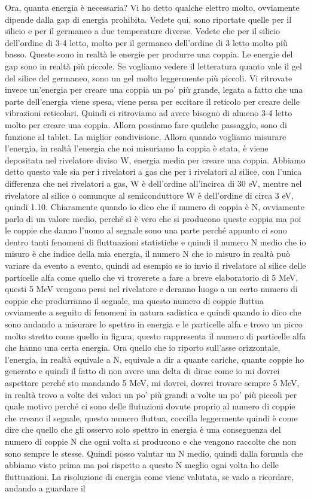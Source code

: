 {Ora, quanta energia è necessaria? Vi ho detto qualche elettro molto, ovviamente dipende dalla gap di energia prohibita. Vedete qui, sono riportate quelle per il silicio e per il germaneo a due temperature diverse. Vedete che per il silicio dell'ordine di 3-4 letto, molto per il germaneo dell'ordine di 3 letto molto più basso. Queste sono in realtà le energie per produrre una coppia. Le energie del gap sono in realtà più piccole. Se vogliamo vedere il letteratura quanto vale il gel del silice del germaneo, sono un gel molto leggermente più piccoli. Vi ritrovate invece un'energia per creare una coppia un po' più grande, legata a fatto che una parte dell'energia viene spesa, viene persa per eccitare il reticolo per creare delle vibrazioni reticolari. Quindi ci ritroviamo ad avere bisogno di almeno 3-4 letto molto per creare una coppia. Allora possiamo fare qualche passaggio, sono di funzione al tablet. La miglior condivisione. Allora quando vogliamo misurare l'energia, in realtà l'energia che noi misuriamo la coppia è stata, è viene depositata nel rivelatore diviso W, energia media per creare una coppia. Abbiamo detto questo vale sia per i rivelatori a gas che per i rivelatori al silice, con l'unica differenza che nei rivelatori a gas, W è dell'ordine all'incirca di 30 eV, mentre nel rivelatore al silice o comunque al semiconduttore W è dell'ordine di circa 3 eV, quindi 1.10. Chiaramente quando io dico che il numero di coppia è N, ovviamente parlo di un valore medio, perché sì è vero che si producono queste coppia ma poi le coppie che danno l'uomo al segnale sono una parte perché appunto ci sono dentro tanti fenomeni di fluttuazioni statistiche e quindi il numero N medio che io misuro è che indice della mia energia, il numero N che io misuro in realtà può variare da evento a evento, quindi ad esempio se io invio il rivelatore al silice delle particelle alfa come quello che vi troverete a fare a breve elaboratorio di 5 MeV, questi 5 MeV vengono persi nel rivelatore e deranno luogo a un certo numero di coppie che produrranno il segnale, ma questo numero di coppie fluttua ovviamente a seguito di fenomeni in natura sadistica e quindi quando io dico che sono andando a misurare lo spettro in energia e le particelle alfa e trovo un picco molto stretto come quello in figura, questo rappresenta il numero di particelle alfa che hanno una certa energia. Ora quello che io riporto sull'asse orizzontale, l'energia, in realtà equivale a N, equivale a dir a quante cariche, quante coppie ho generato e quindi il fatto di non avere una delta di dirac come io mi dovrei aspettare perché sto mandando 5 MeV, mi dovrei, dovrei trovare sempre 5 MeV, in realtà trovo a volte dei valori un po' più grandi a volte un po' più piccoli per quale motivo perché ci sono delle flutuzioni dovute proprio al numero di coppie che creano il segnale, questo numero fluttua, coccilla leggermente quindi è come dire che quello che gli osservo solo spettro in energia è una conseguenza del numero di coppie N che ogni volta si producono e che vengono raccolte che non sono sempre le stesse. Quindi posso valutar un N medio, quindi dalla formula che abbiamo visto prima ma poi rispetto a questo N meglio ogni volta ho delle fluttuazioni. La risoluzione di energia come viene valutata, se vado a ricordare, andando a guardare il }
